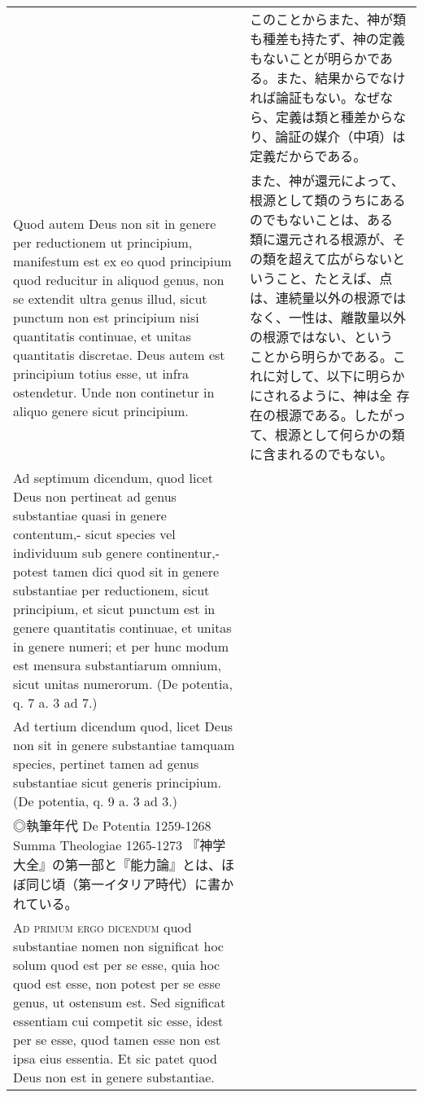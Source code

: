 \documentclass[10pt]{jsarticle}
\begin{document}
\begin{longtable}{p{21em}p{21em}}
&


このことからまた、神が類も種差も持たず、神の定義もないことが明らかであ
る。また、結果からでなければ論証もない。なぜなら、定義は類と種差からな
り、論証の媒介（中項）は定義だからである。

\\

Quod autem Deus non sit in genere per reductionem ut principium,
manifestum est ex eo quod principium quod reducitur in aliquod genus,
non se extendit ultra genus illud, sicut punctum non est principium
nisi quantitatis continuae, et unitas quantitatis discretae.  Deus
autem est principium totius esse, ut infra ostendetur. Unde non
continetur in aliquo genere sicut principium.

&

また、神が還元によって、根源として類のうちにあるのでもないことは、ある
類に還元される根源が、その類を超えて広がらないということ、たとえば、点
は、連続量以外の根源ではなく、一性は、離散量以外の根源ではない、という
ことから明らかである。これに対して、以下に明らかにされるように、神は全
存在の根源である。したがって、根源として何らかの類に含まれるのでもない。
\footnote{◎しかし、ここに見られる「神は還元によっても実体でない」とい
う主張は、安定していない。
\\
Ad septimum dicendum, quod licet Deus non pertineat ad genus
substantiae quasi in genere contentum,- sicut species vel individuum
sub genere continentur,- potest tamen dici quod sit in genere
substantiae per reductionem, sicut principium, et sicut punctum est in
genere quantitatis continuae, et unitas in genere numeri; et per hunc
modum est mensura substantiarum omnium, sicut unitas numerorum. (De
potentia, q. 7 a. 3 ad 7.)
\\
Ad tertium dicendum quod, licet Deus non sit in genere substantiae
 tamquam species, pertinet tamen ad genus substantiae sicut generis
 principium. (De potentia, q. 9 a. 3 ad 3.)
\\
◎執筆年代
De Potentia 1259-1268
Summa Theologiae 1265-1273
『神学大全』の第一部と『能力論』とは、ほぼ同じ頃（第一イタリア時代）に書かれている。
}


\\

{\scshape Ad primum ergo dicendum} quod substantiae nomen non
significat hoc solum quod est per se esse, quia hoc quod est esse, non
potest per se esse genus, ut ostensum est. Sed significat essentiam
cui competit sic esse, idest per se esse, quod tamen esse non est ipsa
eius essentia. Et sic patet quod Deus non est in genere substantiae.


\end{longtable}
\end{document}

